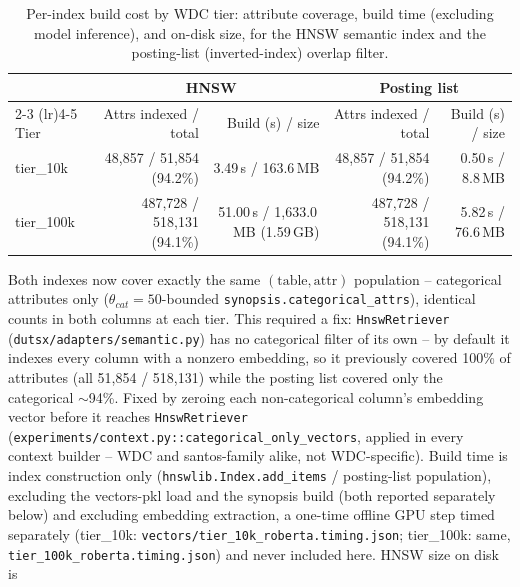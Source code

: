 
\begin{table}[t]
\centering
\begin{threeparttable}
\caption{Per-index build cost by WDC tier: attribute coverage, build time (excluding model
inference), and on-disk size, for the HNSW semantic index and the posting-list (inverted-index)
overlap filter.}
\label{tab:wdc-index-cost}
\begin{tabular}{lrrrr}
\toprule
& \multicolumn{2}{c}{HNSW\tnote{a}} & \multicolumn{2}{c}{Posting list\tnote{a}} \\
\cmidrule(lr){2-3} \cmidrule(lr){4-5}
Tier & Attrs indexed / total & Build (s) / size & Attrs indexed / total & Build (s) / size \\
\midrule
tier\_10k  & 48{,}857 / 51{,}854 (94.2\%)  & 3.49\,s / 163.6\,MB  & 48{,}857 / 51{,}854 (94.2\%)  & 0.50\,s / 8.8\,MB \\
tier\_100k & 487{,}728 / 518{,}131 (94.1\%) & 51.00\,s / 1{,}633.0\,MB (1.59\,GB) & 487{,}728 / 518{,}131 (94.1\%) & 5.82\,s / 76.6\,MB \\
\bottomrule
\end{tabular}
\begin{tablenotes}
\footnotesize
\item[a] Both indexes now cover exactly the same $(\text{table}, \text{attr})$ population --
  categorical attributes only ($\theta_{cat}=50$-bounded \texttt{synopsis.categorical\_attrs}),
  identical counts in both columns at each tier. This required a fix: \texttt{HnswRetriever}
  (\texttt{dutsx/adapters/semantic.py}) has no categorical filter of its own -- by default it
  indexes every column with a nonzero embedding, so it previously covered 100\% of attributes
  (all 51{,}854 / 518{,}131) while the posting list covered only the categorical $\sim$94\%. Fixed
  by zeroing each non-categorical column's embedding vector before it reaches
  \texttt{HnswRetriever} (\texttt{experiments/context.py::categorical\_only\_vectors}, applied in
  every context builder -- WDC and santos-family alike, not WDC-specific). Build time is index
  construction only (\texttt{hnswlib.Index.add\_items} / posting-list population), excluding the
  vectors-pkl load and the synopsis build (both reported separately below) and excluding embedding
  extraction, a one-time offline GPU step timed separately (tier\_10k:
  \texttt{vectors/tier\_10k\_roberta.timing.json}; tier\_100k: same,
  \texttt{tier\_100k\_roberta.timing.json}) and never included here. HNSW size on disk is

\end{tablenotes}
\end{threeparttable}
\end{table}
